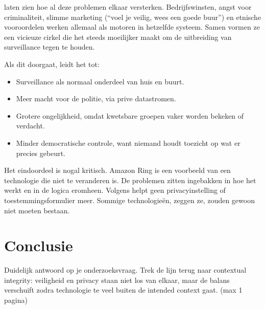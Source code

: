 \documentclass[nonacm,sigconf]{acmart}
\begin{document}
    \noindent\citeauthor{selinger2022amazon} laten zien hoe al deze problemen elkaar versterken.
    Bedrijfswinsten, angst voor criminaliteit, slimme marketing (“voel je veilig, wees een goede buur”) en etnische vooroordelen werken allemaal als motoren in hetzelfde systeem.
    Samen vormen ze een vicieuze cirkel die het steeds moeilijker maakt om de uitbreiding van surveillance tegen te houden.

    \noindent Als dit doorgaat, leidt het tot:
    \begin{itemize}
        \item Surveillance als normaal onderdeel van huis en buurt.
        \item Meer macht voor de politie, via prive datastromen.
        \item Grotere ongelijkheid, omdat kwetsbare groepen vaker worden bekeken of verdacht.
        \item Minder democratische controle, want niemand houdt toezicht op wat er precies gebeurt.
    \end{itemize}

    \noindent Het eindoordeel is nogal kritisch.
    Amazon Ring is een voorbeeld van een technologie die niet te veranderen is.
    De problemen zitten ingebakken in hoe het werkt en in de logica eromheen.
    Volgens \citeauthor{selinger2022amazon} helpt geen privacyinstelling of toestemmingsformulier meer.
    Sommige technologieën, zeggen ze, zouden gewoon niet moeten bestaan.

    \subsection{}
    \parencite{kelly2023ring}

    \subsection{}
    \parencite{chaudhari2020smart}

    \subsection{}
    \parencite{tabassum2023exploring}


    \section{Conclusie}
    Duidelijk antwoord op je onderzoeksvraag.
    Trek de lijn terug naar contextual integrity: veiligheid en privacy staan niet los van elkaar, maar de balans verschuift zodra technologie te veel buiten de intended context gaat. (max 1 pagina)

    \printbibliography

    \balance %
\end{document}
